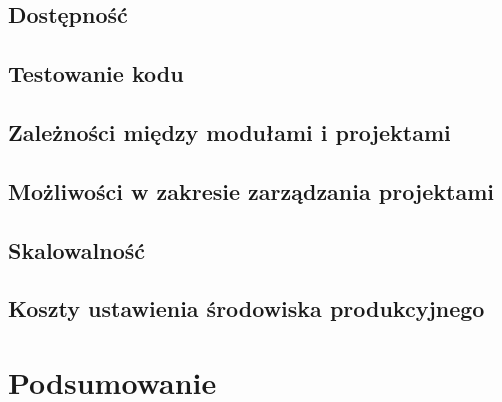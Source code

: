 \documentclass{SGGW-thesis}
\begin{document}
  \section{Dostępność}
  \section{Testowanie kodu}
  \section{Zależności między modułami i projektami}
  \section{Możliwości w zakresie zarządzania projektami}
  \section{Skalowalność}
  \section{Koszty ustawienia środowiska produkcyjnego}

\chapter{Podsumowanie}

\nocite{*}
\printbibliography[heading=bibnumbered,title={Bibliografia}]

\beforelastpage
\end{document}
